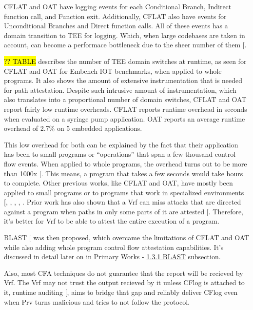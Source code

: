 \documentclass[a4paper, nobind]{templates/ociamthesis}
\begin{document}
CFLAT and OAT have logging events for each Conditional Branch, Indirect function call, and Function exit.
Additionally, CFLAT also have events for Unconditional Branches and Direct function calls.
All of these events has a domain transition to TEE for logging. Which, when large codebases
are taken in account, can become a performace bottleneck due to the sheer number of them {[}\citeproc{ref-blast}{56}{]}.

\hl{?? TABLE} describes the number of TEE domain switches at runtime,
as seen for CFLAT and OAT for Embench-IOT benchmarks, when applied to whole programs.
It also shows the amount of extensive instrumentation that is needed for path attestation.
Despite such intrusive amount of instrumentation, which also translates into
a proportional number of domain switches, CFLAT and OAT report fairly low runtime overheads.
CFLAT reports runtime overhead in seconds when evaluated on a syringe pump application.
OAT reports an average runtime overhead of 2.7\% on 5 embedded applications.

This low overhead for both can be explained by the fact that their application
has been to small programs or ``operations'' that span a few thousand control-flow events.
When applied to whole programs, the overhead turns out to be more than 1000x {[}\citeproc{ref-blast}{56}{]}.
This means, a program that takes a few seconds would take hours to complete.
Other previous works, like CFLAT and OAT, have mostly been applied to small
programs or to programs that work in specialized environments {[}, , , , \citeproc{ref-blast}{56}{]}.
Prior work has also shown that a Vrf can miss attacks that are directed against
a program when paths in only some parts of it are attested {[}\citeproc{ref-hu2019probability}{29}{]}.
Therefore, it's better for Vrf to be able to attest the entire execution of a program.

BLAST {[}\citeproc{ref-blast}{56}{]} was then proposed, which overcame the limitations of CFLAT and OAT while
also adding whole program control flow attestation capabilities. It's discussed
in detail later on in Primary Works - \hyperref[blast]{1.3.1 BLAST} subsection.

Also, most CFA techniques do not guarantee that the report will be recieved by Vrf.
The Vrf may not trust the output recieved by it unless CFlog is attached to it,
runtime auditing {[}, \citeproc{ref-caulfield2023acfa}{20}{]} aims to bridge that
gap and reliably deliver CFlog even when Prv turns malicious and tries to not
follow the protocol.
\end{document}
